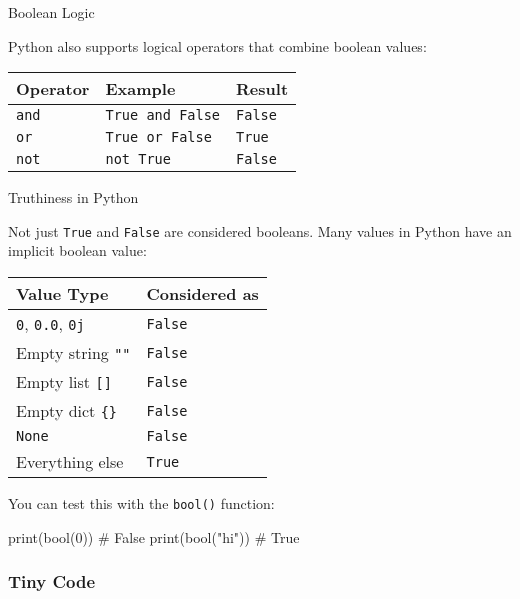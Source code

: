 \documentclass[
  letterpaper,
  DIV=11,
  numbers=noendperiod]{scrreprt}
\newenvironment{Shaded}{\begin{snugshade}}{\end{snugshade}}
\newcommand{\BuiltInTok}[1]{\textcolor[rgb]{0.00,0.23,0.31}{#1}}
\newcommand{\CommentTok}[1]{\textcolor[rgb]{0.37,0.37,0.37}{#1}}
\newcommand{\DecValTok}[1]{\textcolor[rgb]{0.68,0.00,0.00}{#1}}
\newcommand{\NormalTok}[1]{\textcolor[rgb]{0.00,0.23,0.31}{#1}}
\newcommand{\StringTok}[1]{\textcolor[rgb]{0.13,0.47,0.30}{#1}}
\begin{document}
Boolean Logic

Python also supports logical operators that combine boolean values:

\begin{longtable}[]{@{}lll@{}}
\toprule\noalign{}
Operator & Example & Result \\
\midrule\noalign{}
\endhead
\bottomrule\noalign{}
\endlastfoot
\texttt{and} & \texttt{True\ and\ False} & \texttt{False} \\
\texttt{or} & \texttt{True\ or\ False} & \texttt{True} \\
\texttt{not} & \texttt{not\ True} & \texttt{False} \\
\end{longtable}

Truthiness in Python

Not just \texttt{True} and \texttt{False} are considered booleans. Many
values in Python have an implicit boolean value:

\begin{longtable}[]{@{}ll@{}}
\toprule\noalign{}
Value Type & Considered as \\
\midrule\noalign{}
\endhead
\bottomrule\noalign{}
\endlastfoot
\texttt{0}, \texttt{0.0}, \texttt{0j} & \texttt{False} \\
Empty string \texttt{""} & \texttt{False} \\
Empty list \texttt{{[}{]}} & \texttt{False} \\
Empty dict \texttt{\{\}} & \texttt{False} \\
\texttt{None} & \texttt{False} \\
Everything else & \texttt{True} \\
\end{longtable}

You can test this with the \texttt{bool()} function:

\begin{Shaded}
\begin{Highlighting}[]
\BuiltInTok{print}\NormalTok{(}\BuiltInTok{bool}\NormalTok{(}\DecValTok{0}\NormalTok{))     }\CommentTok{\# False}
\BuiltInTok{print}\NormalTok{(}\BuiltInTok{bool}\NormalTok{(}\StringTok{"hi"}\NormalTok{))  }\CommentTok{\# True}
\end{Highlighting}
\end{Shaded}

\subsubsection{Tiny Code}\label{tiny-code-8}
\end{document}
